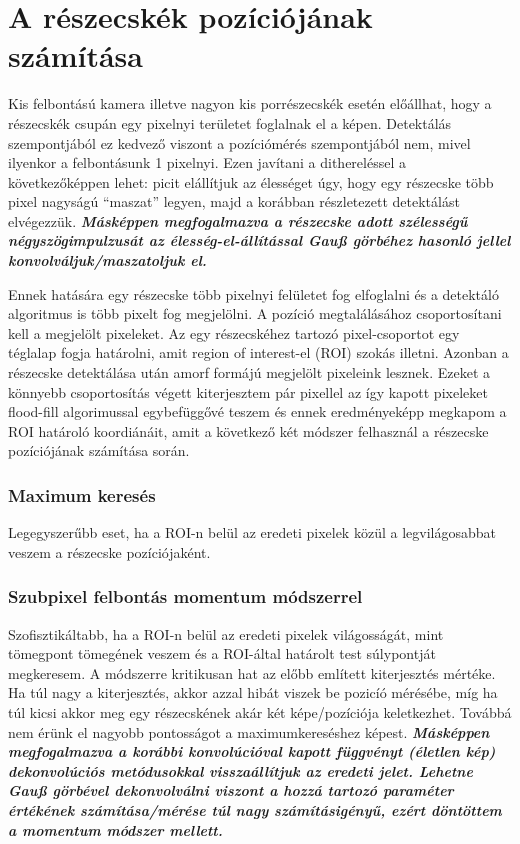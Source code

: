 \section{A részecskék pozíciójának számítása}
	Kis felbontású kamera illetve nagyon kis porrészecskék esetén előállhat, hogy a részecskék csupán egy
	pixelnyi területet foglalnak el a képen. Detektálás szempontjából ez kedvező viszont a pozíciómérés
	szempontjából nem, mivel ilyenkor a felbontásunk 1 pixelnyi. Ezen javítani a dithereléssel a
	következőképpen lehet: picit elállítjuk az élességet úgy, hogy egy részecske több pixel nagyságú
	``maszat'' legyen, majd a korábban részletezett detektálást elvégezzük.
	\textit{\textbf{Másképpen megfogalmazva a részecske adott szélességű négyszögimpulzusát az élesség-el-állítással Gauß görbéhez
	hasonló jellel konvolváljuk/maszatoljuk el.}}
	
	Ennek hatására egy részecske több pixelnyi felületet fog elfoglalni és a detektáló algoritmus is
	több pixelt fog megjelölni. A pozíció megtalálásához csoportosítani kell a megjelölt pixeleket.
	Az egy részecskéhez tartozó pixel-csoportot egy téglalap fogja határolni, amit region of
	interest-el (ROI) szokás illetni. Azonban a részecske detektálása után amorf formájú megjelölt
	pixeleink lesznek. Ezeket a könnyebb csoportosítás végett kiterjesztem pár pixellel az így kapott
	pixeleket flood-fill algorimussal egybefüggővé teszem és ennek eredményeképp megkapom a ROI határoló
	koordiánáit, amit a következő két módszer felhasznál a részecske pozíciójának számítása során.
	\subsubsection*{Maximum keresés}
	Legegyszerűbb eset, ha a ROI-n belül az eredeti pixelek közül a legvilágosabbat veszem a
	részecske pozíciójaként.
	\subsubsection*{Szubpixel felbontás momentum módszerrel}
	Szofisztikáltabb, ha a ROI-n belül az eredeti pixelek világosságát, mint tömegpont tömegének veszem
	és a ROI-által határolt test súlypontját megkeresem. A módszerre kritikusan hat az előbb említett
	kiterjesztés mértéke. Ha túl nagy a kiterjesztés, akkor azzal hibát viszek be pozicíó mérésébe,
	míg ha túl kicsi akkor meg egy részecskének akár két képe/pozíciója keletkezhet. Továbbá nem érünk el nagyobb pontosságot a
	maximumkereséshez képest.
	\textit{\textbf{Másképpen megfogalmazva a korábbi konvolúcióval kapott függvényt (életlen kép) dekonvolúciós metódusokkal
	visszaállítjuk az eredeti jelet.
	Lehetne Gauß görbével dekonvolválni viszont a hozzá tartozó paraméter értékének számítása/mérése túl nagy számításigényű, ezért
	döntöttem a momentum módszer mellett.}}
	
